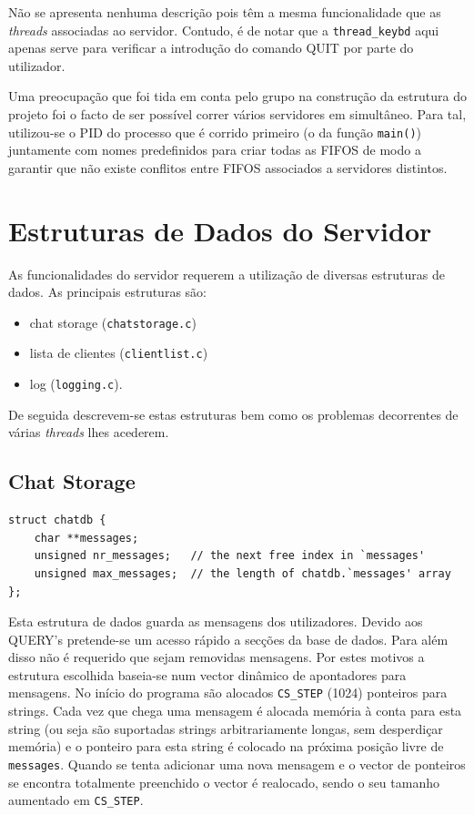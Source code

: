 \documentclass[a4paper]{article}
\begin{document}
	Não se apresenta nenhuma descrição pois têm a mesma funcionalidade que as \textit{threads} associadas ao servidor. Contudo, é de notar que a \texttt{thread\_keybd} aqui apenas serve para verificar a introdução do comando QUIT por parte do utilizador.

	Uma preocupação que foi tida em conta pelo grupo na construção da estrutura do projeto foi o facto de ser possível correr vários servidores em simultâneo. Para tal, utilizou-se o PID do processo que é corrido primeiro (o da função \texttt{main()}) juntamente com nomes predefinidos para criar todas as FIFOS de modo a garantir que não existe conflitos entre FIFOS associados a servidores distintos.




	\section{Estruturas de Dados do Servidor}

	As funcionalidades do servidor requerem a utilização de diversas estruturas de dados. As principais estruturas são: 

	\begin{itemize}
		\item chat storage (\texttt{chatstorage.c}) 
		\item lista de clientes (\texttt{clientlist.c}) 
		\item log (\texttt{logging.c}). 
	\end{itemize}

	De seguida descrevem-se estas estruturas bem como os problemas decorrentes de várias \textit{threads} lhes acederem.
	
	\subsection{Chat Storage}

	\begin{verbatim}
struct chatdb { 
    char **messages; 
    unsigned nr_messages;   // the next free index in `messages' 
    unsigned max_messages;  // the length of chatdb.`messages' array 
};
	\end{verbatim}
	
	Esta estrutura de dados guarda as mensagens dos utilizadores. Devido aos QUERY's pretende-se um acesso rápido a secções da base de dados. Para além disso não é requerido que sejam removidas mensagens. Por estes motivos a estrutura escolhida baseia-se num vector dinâmico de apontadores para mensagens. No início do programa são alocados \texttt{CS\_STEP} (1024) ponteiros para strings. Cada vez que chega uma mensagem é alocada memória à conta para esta string (ou seja são suportadas strings arbitrariamente longas, sem desperdiçar memória) e o ponteiro para esta string é colocado na próxima posição livre de \texttt{messages}. Quando se tenta adicionar uma nova mensagem e o vector de ponteiros se encontra totalmente preenchido o vector é realocado, sendo o seu tamanho aumentado em \texttt{CS\_STEP}.
	
\end{document}
